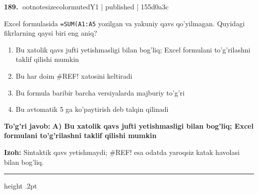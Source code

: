 \documentclass[10pt,a4paper]{article}
\begin{document}
\textbf{\color{ink}189.} {ootnotesizecolor{muted}Y1 | published | 155d0a3c}
\par
Excel formulasida \texttt{=SUM(A1:A5} yozilgan va yakuniy qavs qo'yilmagan. Quyidagi fikrlarning qaysi biri eng aniq?
\begin{enumerate}[label=\Alph*),leftmargin=9mm]
\item Bu xatolik qavs jufti yetishmasligi bilan bog'liq; Excel formulani to'g'rilashni taklif qilishi mumkin
\item Bu har doim \#REF! xatosini keltiradi
\item Bu formula baribir barcha versiyalarda majburiy to'g'ri
\item Bu avtomatik 5 ga ko'paytirish deb talqin qilinadi
\end{enumerate}
\begin{tcolorbox}[enhanced,breakable,colback=teal!4,colframe=teal!55!black,boxrule=0.45pt,arc=1.2mm,left=2.8mm,right=2.8mm,top=2mm,bottom=2mm]
\textbf{\color{teal}To'g'ri javob:} \textbf{A) Bu xatolik qavs jufti yetishmasligi bilan bog'liq; Excel formulani to'g'rilashni taklif qilishi mumkin}
\par\smallskip
\textbf{Izoh:} Sintaktik qavs yetishmaydi; \#REF! esa odatda yaroqsiz katak havolasi bilan bog'liq.
\end{tcolorbox}
\vspace{2mm}\hrule height .2pt\vspace{2mm}
\end{document}
